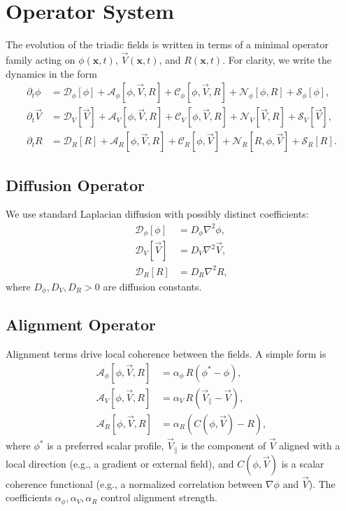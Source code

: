 \section{Operator System}

The evolution of the triadic fields is written in terms of a minimal operator family acting on
\(\phi(\mathbf{x}, t)\), \(\vec{V}(\mathbf{x}, t)\), and \(R(\mathbf{x}, t)\). For clarity, we write the dynamics in the form
\begin{align}
    \partial_t \phi &= \mathcal{D}_\phi[\phi] + \mathcal{A}_\phi[\phi, \vec{V}, R] + \mathcal{C}_\phi[\phi, \vec{V}, R] + \mathcal{N}_\phi[\phi, R] + \mathcal{S}_\phi[\phi], \\
    \partial_t \vec{V} &= \mathcal{D}_V[\vec{V}] + \mathcal{A}_V[\phi, \vec{V}, R] + \mathcal{C}_V[\phi, \vec{V}, R] + \mathcal{N}_V[\vec{V}, R] + \mathcal{S}_V[\vec{V}], \\
    \partial_t R &= \mathcal{D}_R[R] + \mathcal{A}_R[\phi, \vec{V}, R] + \mathcal{C}_R[\phi, \vec{V}] + \mathcal{N}_R[R, \phi, \vec{V}] + \mathcal{S}_R[R].
\end{align}

\subsection{Diffusion Operator}

We use standard Laplacian diffusion with possibly distinct coefficients:
\begin{align}
    \mathcal{D}_\phi[\phi] &= D_\phi \nabla^2 \phi, \\
    \mathcal{D}_V[\vec{V}] &= D_V \nabla^2 \vec{V}, \\
    \mathcal{D}_R[R] &= D_R \nabla^2 R,
\end{align}
where \(D_\phi, D_V, D_R > 0\) are diffusion constants.

\subsection{Alignment Operator}

Alignment terms drive local coherence between the fields. A simple form is
\begin{align}
    \mathcal{A}_\phi[\phi, \vec{V}, R] &= \alpha_\phi\, R \left( \phi^\ast - \phi \right), \\
    \mathcal{A}_V[\phi, \vec{V}, R] &= \alpha_V\, R \left( \vec{V}_\parallel - \vec{V} \right), \\
    \mathcal{A}_R[\phi, \vec{V}, R] &= \alpha_R \left( C(\phi, \vec{V}) - R \right),
\end{align}
where \(\phi^\ast\) is a preferred scalar profile, \(\vec{V}_\parallel\) is the component of \(\vec{V}\) aligned with a local direction (e.g., a gradient or external field), and \(C(\phi, \vec{V})\) is a scalar coherence functional (e.g., a normalized correlation between \(\nabla \phi\) and \(\vec{V}\)). The coefficients \(\alpha_\phi, \alpha_V, \alpha_R\) control alignment strength.

